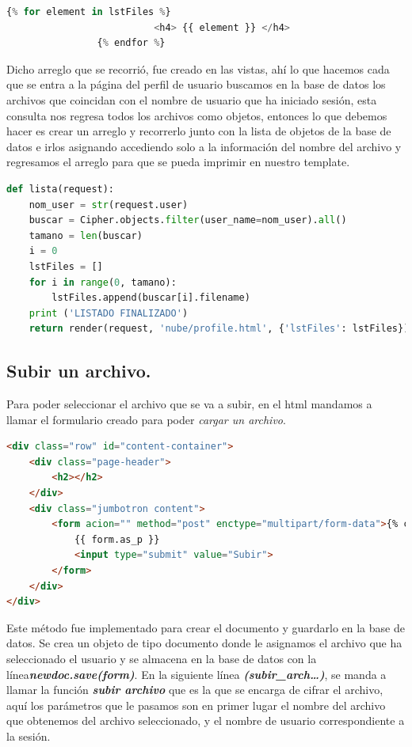\begin{lstlisting}[language=Python,frame=single, keywordstyle=\color{blue},breaklines=true]
		{% for element in lstFiles %}
                	      <h4> {{ element }} </h4>
            	{% endfor %}
\end{lstlisting}

Dicho arreglo que se recorrió, fue creado en las vistas, ahí lo que hacemos cada que se entra a la página del perfil de usuario buscamos en la base de datos los archivos que coincidan con el nombre de usuario que ha iniciado sesión, esta consulta nos regresa todos los archivos como objetos, entonces lo que debemos hacer es crear un arreglo y recorrerlo junto con la lista de objetos de la base de datos e irlos asignando accediendo solo a la información del nombre del archivo y regresamos el arreglo para que se pueda imprimir en nuestro template.

\begin{lstlisting}[language=Python,frame=single, keywordstyle=\color{blue},breaklines=true, showstringspaces=false]
def lista(request):
    nom_user = str(request.user)
    buscar = Cipher.objects.filter(user_name=nom_user).all()
    tamano = len(buscar)
    i = 0
    lstFiles = []
    for i in range(0, tamano):
        lstFiles.append(buscar[i].filename)
    print ('LISTADO FINALIZADO')
    return render(request, 'nube/profile.html', {'lstFiles': lstFiles})

\end{lstlisting}

\subsection{Subir un archivo. } 
Para poder seleccionar el archivo que se va a subir, en el html mandamos a llamar el formulario creado para poder \textit{cargar un archivo}.

\begin{lstlisting}[language=HTML,frame=single, keywordstyle=\color{blue},breaklines=true]
<div class="row" id="content-container">
	<div class="page-header">
		<h2></h2>
	</div>
	<div class="jumbotron content">
		<form acion="" method="post" enctype="multipart/form-data">{% csrf_token %}
			{{ form.as_p }}
			<input type="submit" value="Subir">
		</form>
	</div>
</div>
\end{lstlisting}


Este método fue implementado para crear el documento y guardarlo en la base de datos. Se crea un objeto de tipo documento donde le asignamos el archivo que ha seleccionado el usuario y se almacena en la base de datos con la línea\textbf{\textit{newdoc.save(form)}}.
En la siguiente línea \textbf{\textit{(subir\_arch…)}}, se manda a llamar la función \textbf{\textit{subir archivo}} que es la que se encarga de cifrar el archivo, aquí los parámetros que le pasamos son en primer lugar el nombre del archivo que obtenemos del archivo seleccionado, y el nombre de usuario correspondiente a la sesión.

